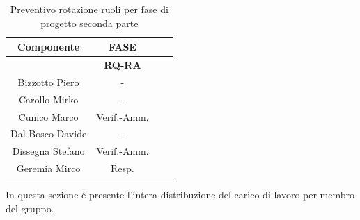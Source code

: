\begin{table}[!h]
	\begin{center}
		  \begin{tabular}
			  {|c|c|c|c|}
			\hline
			\textbf{Componente} & \multicolumn{1}{|c|}{ \textbf{FASE} } \\
			\hline
			& \textbf{RQ-RA} \\
			\hline
			Bizzotto Piero & -   \\
			\hline
			Carollo Mirko & -   \\
			\hline
			Cunico Marco & Verif.-Amm.   \\
			\hline
			Dal Bosco Davide & -   \\
			\hline
			Dissegna Stefano & Verif.-Amm.   \\
			\hline
			Geremia Mirco & Resp.   \\
			\hline

		\end{tabular}
	\caption{Preventivo rotazione ruoli per fase di progetto seconda parte} %
	\label{tab:TabellaRotazRuoli}
	\end{center}	
\end{table}

In questa sezione \'e presente l'intera distribuzione del carico di lavoro per membro del gruppo.\\

